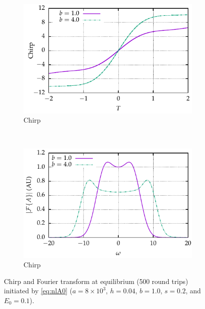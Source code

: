 \documentclass[9pt,twocolumn,twoside]{osajnl}
\begin{document}
\begin{figure}[tbp]
	\centering
	\begin{subfigure}{\columnwidth}
		\centering
		\includegraphics{Figures/Chirp}
		\caption{Chirp}
		\label{fig:}
	\end{subfigure} \\
	\vspace{3mm}
	\begin{subfigure}{\columnwidth}
		\centering
		\includegraphics{Figures/FT}
		\caption{Chirp}
		\label{fig:}
	\end{subfigure}
	\caption{Chirp and Fourier transform at equilibrium (500 round trips) initiated by \eqref{eq:nlA0} ($a = 8 \times 10^3$, $h = 0.04$, $b = 1.0$, $s = 0.2$, and $E_0 = 0.1$).}
	\label{fig:chirpft}
\end{figure}
\end{document}
